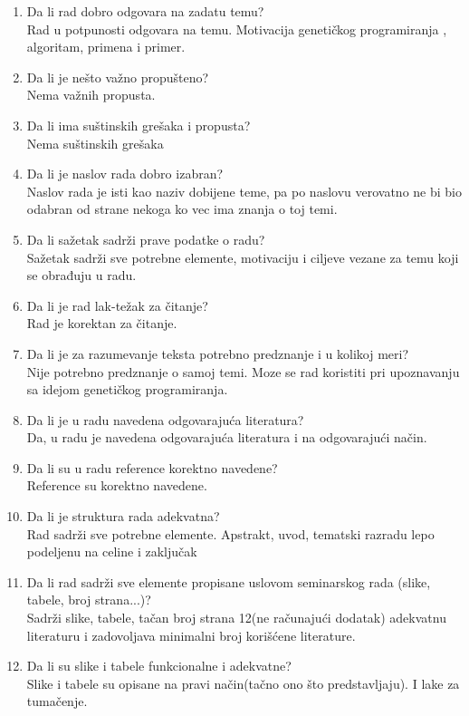 \documentclass[a4paper]{report}
\begin{document}
\begin{enumerate}
\item Da li rad dobro odgovara na zadatu temu?\\
Rad u potpunosti odgovara na temu. Motivacija genetičkog programiranja , algoritam, primena i primer. 
\item Da li je nešto važno propušteno?\\
Nema važnih propusta.
\item Da li ima suštinskih grešaka i propusta?\\
Nema suštinskih grešaka
\item Da li je naslov rada dobro izabran?\\
Naslov rada je isti kao naziv dobijene teme, pa po naslovu verovatno ne bi bio odabran od strane nekoga ko vec ima znanja o toj temi.
\item Da li sažetak sadrži prave podatke o radu?\\
Sažetak sadrži sve potrebne elemente, motivaciju i ciljeve vezane za temu koji se obrađuju u radu.
\item Da li je rad lak-težak za čitanje?\\
Rad je korektan za čitanje.
\item Da li je za razumevanje teksta potrebno predznanje i u kolikoj meri?\\
Nije potrebno predznanje o samoj temi. Moze se rad koristiti pri upoznavanju sa idejom genetičkog programiranja.
\item Da li je u radu navedena odgovarajuća literatura?\\
Da, u radu je navedena odgovarajuća literatura i na odgovarajući način.
\item Da li su u radu reference korektno navedene?\\
Reference su korektno navedene.
\item Da li je struktura rada adekvatna?\\
Rad sadrži sve potrebne elemente. Apstrakt, uvod, tematski razradu lepo podeljenu na celine i zaključak
\item Da li rad sadrži sve elemente propisane uslovom seminarskog rada (slike, tabele, broj strana...)?\\
Sadrži slike, tabele, tačan broj strana 12(ne računajući dodatak) adekvatnu literaturu i zadovoljava minimalni broj korišćene literature.
\item Da li su slike i tabele funkcionalne i adekvatne?\\
Slike i tabele su opisane na pravi način(tačno ono što predstavljaju).
I lake za tumačenje.
\end{enumerate}
\end{document}

